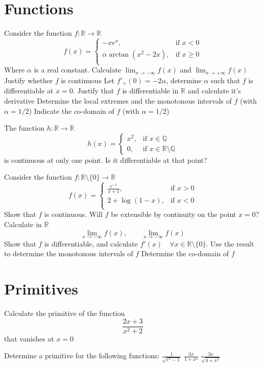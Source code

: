 \documentclass[12pt]{article}
\begin{document}
\section{Functions}
\begin{ExerciseList}
	\Exercise Consider the function $f\colon \mathbb R \to \mathbb R$
	$$f(x) = \begin{cases} -x e^x, & \mbox{if $x<0$} \\ \alpha\arctan(x^2-2x), &\mbox{if $x\ge 0$} \\ \end{cases}$$
	Where $\alpha$ is a real constant.
	\Question Calculate $\lim_{x\to -\infty}f(x)$ and $\lim_{x\to +\infty}f(x)$
	\Question Justify whether $f$ is continuous
	\Question Let $f'_+(0)=-2\alpha$, determine $\alpha$ such that $f$ is differentiable at $x=0$. Justify that $f$ is differentiable in $\mathbb R$ and calculate it's derivative
	\Question Determine the local extremes and the monotonous intervals of $f$ (with $\alpha = 1/2$)
	\Question Indicate the co-domain of $f$ (with $\alpha=1/2$)

	\Exercise The function $h\colon \mathbb R \to \mathbb R$
	$$h(x)=\begin{cases}x^2, & \mbox{if $x\in\mathbb Q$} \\ 0, & \mbox{if $x\in\mathbb R\setminus\mathbb Q$}\end{cases}$$
	is continuous at only one point. Is it differentiable at that point?

	\Exercise Consider the function $f\colon \mathbb R\setminus\{0\}\to\mathbb R$
	$$f(x) = \begin{cases} \frac{e^{-x}}{x+1}, & \mbox{if $x>0$} \\ 2+\log(1-x), & \mbox{if $x<0$} \\ \end{cases}$$
	\Question Show that $f$ is continuous. Will $f$ be extensible by continuity on the point $x=0$?
	\Question Calculate in $\overline{\mathbb R}$
	$$\lim_{x\to -\infty}f(x), \qquad \lim_{x\to -\infty}f(x)$$
	\Question Show that $f$ is differentiable, and calculate $f'(x)\quad\forall x\in\mathbb R\setminus \{ 0\}$.
	Use the result to determine the monotonous intervals of $f$
	\Question Determine the co-domain of $f$
\end{ExerciseList}

\section{Primitives}
\begin{ExerciseList}
	\Exercise Calculate the primitive of the function $$\frac{2x+3}{x^2+2}$$ that vanishes at $x=0$

	\Exercise Determine a primitive for the following functions:
	\Question $\frac{1}{\sqrt{e^x - 1}}$
	\Question $\frac{3x}{1+x^4}$
	\Question $\frac{3x}{\sqrt{4+x^2}}$
\end{ExerciseList}
\end{document}
